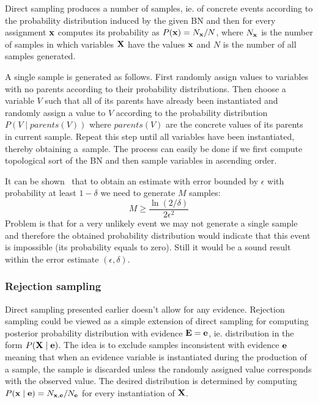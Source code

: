 \documentclass[english,cover]{fitthesis} %
\newcommand{\vars}[1]{{\bold{#1}}}         %
\begin{document}
Direct sampling produces a number of samples, ie. of concrete events according to the probability distribution induced by the given BN and then for every assignment $\vars{x}$ computes its probability as $P(\vars{x}) = N_\vars{x} / N$, where $N_\vars{x}$ is the number of samples in which variables $\vars{X}$ have the values $\vars{x}$ and $N$ is the number of all samples generated.

A single sample is generated as follows. First randomly assign values to variables with no parents according to their probability distributions. Then choose a variable $V$ such that all of its parents have already been instantiated and randomly assign a value to $V$ according to the probability distribution $P(V \mid parents(V))$ where $parents(V)$ are the concrete values of its parents in current sample. Repeat this step until all variables have been instantiated, thereby obtaining a~sample. The process can easily be done if we first compute topological sort of the BN and then sample variables in ascending order.

It can be shown~\cite[p.~491]{pgm} that to obtain an estimate with error bounded by $\epsilon$ with probability at least $1-\delta$ we need to generate $M$ samples:
\begin{equation*}%
M \geq \frac{\ln(2 / \delta)}{2 \epsilon ^ 2}
\end{equation*}
Problem is that for a very unlikely event we may not generate a single sample and therefore the obtained probability distribution would indicate that this event is impossible (its probability equals to zero). Still it would be a sound result within the error estimate $(\epsilon, \delta)$.

\subsubsection{Rejection sampling}
Direct sampling presented earlier doesn't allow for any evidence. Rejection sampling could be viewed as a simple extension of direct sampling for computing posterior probability distribution with evidence $\vars{E} = \vars{e}$, ie. distribution in the form $P(\vars{X} \mid \vars{e})$. The idea is to exclude samples inconsistent with evidence $\vars{e}$ meaning that when an evidence variable is instantiated during the production of a sample, the sample is discarded unless the randomly assigned value corresponds with the observed value. The desired distribution is determined by computing $P(\vars{x} \mid \vars{e}) = N_{\vars{x}, \vars{e}} / N_\vars{e}$ for every instantiation of $\vars{X}$.
\end{document}
